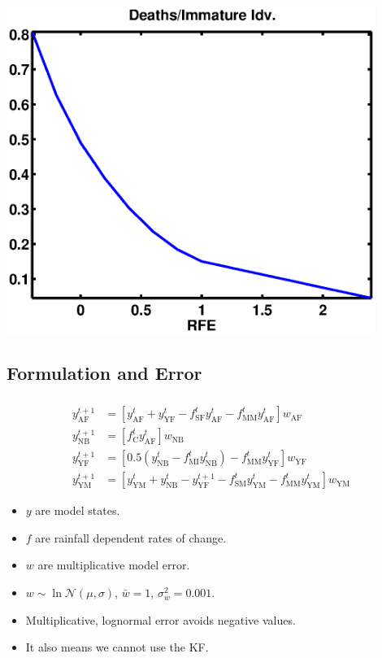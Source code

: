 \documentclass[mathserif]{beamer}
\begin{document}
\begin{frame}
\begin{center}
\frametitle{\insertsubsection}
\includegraphics[width=0.9\textwidth]{mortImm}
\end{center}
\end{frame}

\subsection{Formulation and Error}
\begin{frame}
\begin{center}
\frametitle{\insertsubsection}
\begin{align}
  y_{\text{AF}}^{t+1} &= [y_{\text{AF}}^t + y_{\text{YF}}^t - f_{\text{SF}}^ty_{\text{AF}}^t - f_{\text{MM}}^ty_{\text{AF}}^t]w_{\text{AF}}\\
  y_{\text{NB}}^{t+1} &= [f_{\text{C}}^ty_{\text{AF}}^t]w_{\text{NB}}\\
  y_{\text{YF}}^{t+1} &= [0.5(y_{\text{NB}}^t - f_{\text{MI}}^ty_{\text{NB}}^t) - f_{\text{MM}}^ty_{\text{YF}}^t]w_{\text{YF}}\\
  y_{\text{YM}}^{t+1} &= [y_{\text{YM}}^t + y_{\text{NB}}^t - y_{\text{YF}}^{t+1} - f_{\text{SM}}^ty_{\text{YM}}^t - f_{\text{MM}}^ty_{\text{YM}}^t]w_{\text{YM}}
\end{align}
\end{center}
\begin{itemize}
\item $y$ are model states.
\item $f$ are rainfall dependent rates of change.
\item $w$ are multiplicative model error.
\item $w\sim\ln\mathcal{N}(\mu,\sigma)$, $\bar{w}=1$, $\sigma_w^2 = 0.001$.
\item Multiplicative, lognormal error avoids negative values.
\item It also means we cannot use the KF.
\end{itemize}
\end{frame}
\end{document}
